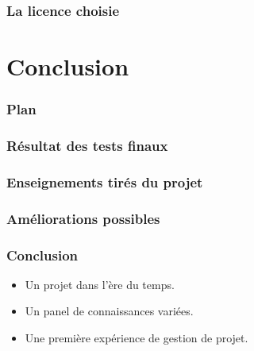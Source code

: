 \documentclass[xcolor=table]{beamer}
\begin{document}
\begin{frame}
\frametitle{La licence choisie}

\end{frame}

\section{Conclusion}
\begin{frame}  
\frametitle{Plan} 
\end{frame}

\begin{frame}
\frametitle{Résultat des tests finaux}

\end{frame}

\begin{frame}
\frametitle{Enseignements tirés du projet}

\end{frame}


\begin{frame}
\frametitle{Améliorations possibles}
\end{frame}

\begin{frame}
\frametitle{Conclusion}
\begin{itemize}
\item Un projet dans l'ère du temps.
\item Un panel de connaissances variées.
\item Une première expérience de gestion de projet.
\end{itemize}
\end{frame}




\end{document}
